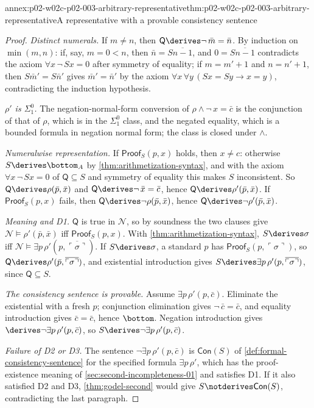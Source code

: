 \begin{annexitem}{annex:p02-w02c-p02-003-arbitrary-representative}{thm:p02-w02c-p02-003-arbitrary-representative}{A representative with a provable consistency sentence}
\begin{proof}
\emph{Distinct numerals.}  If \(m\ne n\), then
\(\mathsf Q\derives\neg\,\bar m=\bar n\).  By induction on \(\min(m,n)\):
if, say, \(m=0<n\), then \(\bar n=S\overline{n-1}\), and \(0=S\overline{n-1}\)
contradicts the axiom \(\forall x\,\neg\,Sx=0\) after symmetry of equality;
if \(m=m'+1\) and \(n=n'+1\), then \(S\bar m'=S\bar n'\) gives
\(\bar m'=\bar n'\) by the axiom
\(\forall x\,\forall y\,(Sx=Sy\to x=y)\), contradicting the induction
hypothesis.

\emph{\(\rho'\) is \(\Sigma^0_1\).}  The negation-normal-form conversion of
\(\rho\land\neg\,x=\bar c\) is the conjunction of that of \(\rho\), which is
in the \(\Sigma^0_1\) class, and the negated equality, which is a bounded
formula in negation normal form; the class is closed under \(\land\).

\emph{Numeralwise representation.}  If \(\mathsf{Proof}_S(p,x)\) holds, then
\(x\ne c\): otherwise \(S\derives\bottom_A\) by
\cref{thm:arithmetization-syntax}, and with the axiom
\(\forall x\,\neg\,Sx=0\) of \(\mathsf Q\subseteq S\) and symmetry of
equality this makes \(S\) inconsistent.  So \(\mathsf Q\derives\rho(\bar p,\bar x)\)
and \(\mathsf Q\derives\neg\,\bar x=\bar c\), hence
\(\mathsf Q\derives\rho'(\bar p,\bar x)\).  If \(\mathsf{Proof}_S(p,x)\)
fails, then \(\mathsf Q\derives\neg\rho(\bar p,\bar x)\), hence
\(\mathsf Q\derives\neg\rho'(\bar p,\bar x)\).

\emph{Meaning and D1.}  \(\mathsf Q\) is true in \(\mathcal N\), so by
soundness the two clauses give
\(\mathcal N\models\rho'(\bar p,\bar x)\) iff \(\mathsf{Proof}_S(p,x)\).
With \cref{thm:arithmetization-syntax},
\(S\derives\sigma\) iff
\(\mathcal N\models\exists p\,\rho'(p,\overline{\ulcorner\sigma\urcorner})\).
If \(S\derives\sigma\), a standard \(p\) has
\(\mathsf{Proof}_S(p,\ulcorner\sigma\urcorner)\), so
\(\mathsf Q\derives\rho'(\bar p,\overline{\ulcorner\sigma\urcorner})\), and
existential introduction gives
\(S\derives\exists p\,\rho'(p,\overline{\ulcorner\sigma\urcorner})\), since
\(\mathsf Q\subseteq S\).

\emph{The consistency sentence is provable.}  Assume
\(\exists p\,\rho'(p,\bar c)\).  Eliminate the existential with a fresh
\(p\); conjunction elimination gives \(\neg\,\bar c=\bar c\), and equality
introduction gives \(\bar c=\bar c\), hence \(\bottom\).  Negation
introduction gives \(\derives\neg\exists p\,\rho'(p,\bar c)\), so
\(S\derives\neg\exists p\,\rho'(p,\bar c)\).

\emph{Failure of D2 or D3.}  The sentence \(\neg\exists p\,\rho'(p,\bar c)\)
is \(\mathsf{Con}(S)\) of \cref{def:formal-consistency-sentence} for the
specified formula \(\exists p\,\rho'\), which has the proof-existence
meaning of \cref{sec:second-incompleteness-01} and satisfies D1.  If it also
satisfied D2 and D3, \cref{thm:godel-second} would give
\(S\notderives\mathsf{Con}(S)\), contradicting the last paragraph.
\end{proof}
\end{annexitem}
